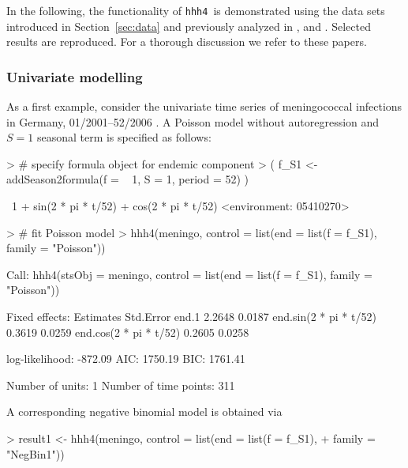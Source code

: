 \documentclass[a4paper,11pt]{article}
\newcommand{\hhh}{\texttt{hhh4}}
\begin{document}
In the following, the functionality of \hhh\ is demonstrated using
the data sets introduced in Section~\ref{sec:data}
and previously analyzed in \cite{paul-etal-2008}, \cite{paul-held-2011} and 
\cite{herzog-etal-2010}.
Selected results are reproduced. For a thorough discussion 
we refer to these papers.

\subsubsection{Univariate modelling}

As a first example, consider the univariate time series of meningococcal infections
in Germany, 01/2001--52/2006 \citep[cf.~Tab.~1 in ][]{paul-etal-2008}.
A Poisson model without autoregression and $S=1$ seasonal term is specified 
as follows:
\begin{Schunk}
\begin{Sinput}
> # specify formula object for endemic component
> ( f_S1 <- addSeason2formula(f = ~ 1, S = 1, period = 52) )
\end{Sinput}
\begin{Soutput}
~1 + sin(2 * pi * t/52) + cos(2 * pi * t/52)
<environment: 05410270>
\end{Soutput}
\begin{Sinput}
> # fit Poisson model
> hhh4(meningo, control = list(end = list(f = f_S1), family = "Poisson")) 
\end{Sinput}
\begin{Soutput}
Call: 
hhh4(stsObj = meningo, control = list(end = list(f = f_S1), family = "Poisson"))


Fixed effects: 
                        Estimates  Std.Error
end.1                      2.2648     0.0187
end.sin(2 * pi * t/52)     0.3619     0.0259
end.cos(2 * pi * t/52)     0.2605     0.0258

log-likelihood:    -872.09 
AIC:               1750.19 
BIC:               1761.41 

Number of units:          1 
Number of time points:    311 
\end{Soutput}
\end{Schunk}
A corresponding negative binomial model is obtained via
\begin{Schunk}
\begin{Sinput}
> result1 <- hhh4(meningo, control = list(end = list(f = f_S1), 
+                                         family = "NegBin1")) 
\end{Sinput}
\end{Schunk}
\end{document}
